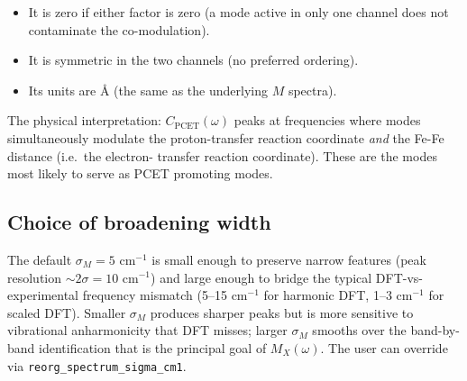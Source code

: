 \documentclass[10pt,a4paper,twoside]{article}
\newcommand{\PCET}{\mathrm{PCET}}
\newcommand{\cfgkey}[1]{\texttt{#1}}
\begin{document}
\begin{itemize}
  \item It is zero if either factor is zero (a mode active in only
        one channel does not contaminate the co-modulation).
  \item It is symmetric in the two channels (no preferred ordering).
  \item Its units are \AA{} (the same as the underlying $M$
        spectra).
\end{itemize}

The physical interpretation: $C_\PCET(\omega)$ peaks at frequencies
where modes simultaneously modulate the proton-transfer reaction
coordinate \emph{and} the Fe-Fe distance (i.e.\ the electron-
transfer reaction coordinate). These are the modes most likely to
serve as PCET promoting modes.

\subsection{Choice of broadening width}

The default $\sigma_M = 5$ cm$^{-1}$ is small enough to preserve
narrow features (peak resolution $\sim 2\sigma = 10$ cm$^{-1}$) and
large enough to bridge the typical DFT-vs-experimental frequency
mismatch (5--15 cm$^{-1}$ for harmonic DFT, 1--3 cm$^{-1}$ for
scaled DFT). Smaller $\sigma_M$ produces sharper peaks but is more
sensitive to vibrational anharmonicity that DFT misses; larger
$\sigma_M$ smooths over the band-by-band identification that is
the principal goal of $M_X(\omega)$. The user can override via
\cfgkey{reorg\_spectrum\_sigma\_cm1}.
\end{document}
